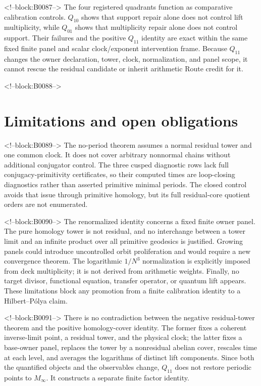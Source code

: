 \documentclass[11pt]{article}
\theoremstyle{definition}
\theoremstyle{remark}
\begin{document}
<!--block:B0087-->
The four registered quadrants function as comparative calibration controls. $Q_{10}$ shows that support repair alone does not control lift multiplicity, while $Q_{01}$ shows that multiplicity repair alone does not control support. Their failures and the positive $Q_{11}$ identity are exact within the same fixed finite panel and scalar clock/exponent intervention frame. Because $Q_{11}$ changes the owner declaration, tower, clock, normalization, and panel scope, it cannot rescue the residual candidate or inherit arithmetic Route credit for it.

<!--block:B0088-->
\section{Limitations and open obligations}

<!--block:B0089-->
The no-period theorem assumes a normal residual tower and one common clock. It does not cover arbitrary nonnormal chains without additional conjugator control. The three cusped diagnostic rows lack full conjugacy-primitivity certificates, so their computed times are loop-closing diagnostics rather than asserted primitive minimal periods. The closed control avoids that issue through primitive homology, but its full residual-core quotient orders are not enumerated.

<!--block:B0090-->
The renormalized identity concerns a fixed finite owner panel. The pure homology tower is not residual, and no interchange between a tower limit and an infinite product over all primitive geodesics is justified. Growing panels could introduce uncontrolled orbit proliferation and would require a new convergence theorem. The logarithmic $1/N^3$ normalization is explicitly imposed from deck multiplicity; it is not derived from arithmetic weights. Finally, no target divisor, functional equation, transfer operator, or quantum lift appears. These limitations block any promotion from a finite calibration identity to a Hilbert--Pólya claim.

<!--block:B0091-->
There is no contradiction between the negative residual-tower theorem and the positive homology-cover identity. The former fixes a coherent inverse-limit point, a residual tower, and the physical clock; the latter fixes a base-owner panel, replaces the tower by a nonresidual abelian cover, rescales time at each level, and averages the logarithms of distinct lift components. Since both the quantified objects and the observables change, $Q_{11}$ does not restore periodic points to $M_\infty$. It constructs a separate finite factor identity.
\end{document}
